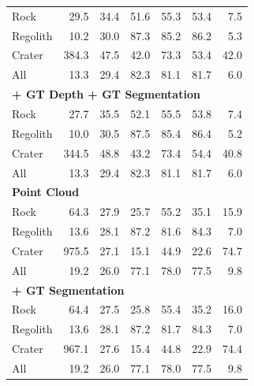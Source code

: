 \begin{table}[h]
\begin{tabular}[t]{|lrrrrrr|}
		Rock                                           & 29.5  & 34.4 & 51.6 & 55.3 & 53.4 & 7.5  \\
		Regolith                                       & 10.2  & 30.0 & 87.3 & 85.2 & 86.2 & 5.3  \\
		Crater                                         & 384.3 & 47.5 & 42.0 & 73.3 & 53.4 & 42.0 \\
		All                                            & 13.3  & 29.4 & 82.3 & 81.1 & 81.7 & 6.0  \\
		\hline
		\multicolumn{7}{|l|}{\textbf{+ GT Depth + GT Segmentation}}                               \\ \hline
		Rock                                           & 27.7  & 35.5 & 52.1 & 55.5 & 53.8 & 7.4  \\
		Regolith                                       & 10.0  & 30.5 & 87.5 & 85.4 & 86.4 & 5.2  \\
		Crater                                         & 344.5 & 48.8 & 43.2 & 73.4 & 54.4 & 40.8 \\
		All                                            & 13.3  & 29.4 & 82.3 & 81.1 & 81.7 & 6.0  \\ \hline\hline
		\multicolumn{7}{|l|}{\textbf{Point Cloud}}                                                \\ \hline
		Rock                                           & 64.3  & 27.9 & 25.7 & 55.2 & 35.1 & 15.9 \\
		Regolith                                       & 13.6  & 28.1 & 87.2 & 81.6 & 84.3 & 7.0  \\
		Crater                                         & 975.5 & 27.1 & 15.1 & 44.9 & 22.6 & 74.7 \\
		All                                            & 19.2  & 26.0 & 77.1 & 78.0 & 77.5 & 9.8  \\
		\hline
		\multicolumn{7}{|l|}{\textbf{+ GT Segmentation}}                                          \\ \hline
		Rock                                           & 64.4  & 27.5 & 25.8 & 55.4 & 35.2 & 16.0 \\
		Regolith                                       & 13.6  & 28.1 & 87.2 & 81.7 & 84.3 & 7.0  \\
		Crater                                         & 967.1 & 27.6 & 15.4 & 44.8 & 22.9 & 74.4 \\
		All                                            & 19.2  & 26.0 & 77.1 & 78.0 & 77.5 & 9.8  \\

\end{tabular}
\end{table}
